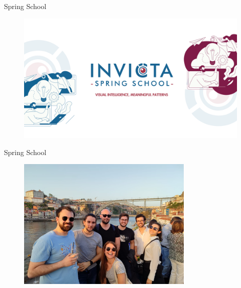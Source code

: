 \begin{frame}{Spring School}
    \begin{figure}
        \centering
        \includegraphics[width=\textwidth]{img/INVICTA2024_banner.png}
    \end{figure}
\end{frame}
\begin{frame}{Spring School}
    \begin{figure}
        \centering
        \includegraphics[width=0.75\textwidth]{img/invicta_group.jpeg}
    \end{figure}
\end{frame}
